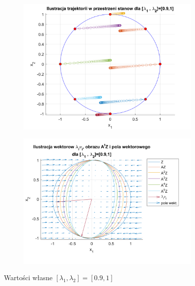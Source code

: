 \documentclass{article}
\begin{document}
\begin{figure}[H]
    \centering
    \begin{subfigure}{0.44\textwidth}
        \includegraphics[width=\textwidth]{portret_fazowy_9_10.png}
    \end{subfigure}
    \begin{subfigure}{0.48\textwidth}
        \includegraphics[width=\textwidth]{pole_wektorowe_9_10.png}
    \end{subfigure}
    \caption{Warto\'sci własne $[ \lambda_1, \lambda_2 ]= [ 0.9, 1 ]$}
    \label{fig::9i10}
\end{figure}
\end{document}

